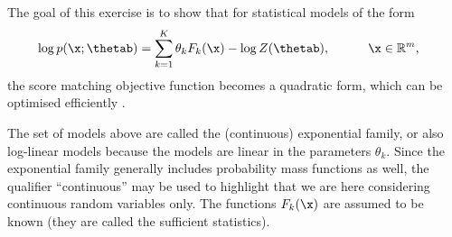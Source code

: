 The goal of this exercise is to show that for statistical models of the form
\begin{align}
  \log p(\x;\thetab) &= \sum_{k=1}^K \theta_k F_k(\x) -\log Z(\thetab), \quad \quad \quad \x \in \mathbb{R}^m,
  \label{eq:exp-family-def}
\end{align}
the score matching objective function becomes a quadratic form, which can be optimised efficiently \citep[see e.g.\ ][Appendix A.5.3]{Barber2012}.

The set of models above are called the (continuous) exponential
family, or also log-linear models because the models are linear in the
parameters $\theta_k$. Since the exponential family generally includes
probability mass functions as well, the qualifier ``continuous'' may
be used to highlight that we are here considering continuous random
variables only. The functions $F_k(\x)$ are assumed to be known (they
are called the sufficient statistics).


